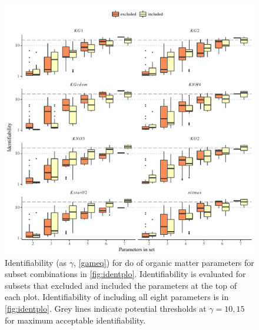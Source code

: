 \documentclass[letterpaper,12pt,oneside]{article}\usepackage[]{graphicx}\usepackage[]{color}
\begin{document}
\begin{figure}[!ht]

{\centering \includegraphics[width=\textwidth]{figs/exclex-1} 

}

\caption{Identifiability (as $\gamma$, \cref{gameq}) for \ac{do} of organic matter parameters for subset combinations in \cref{fig:identplo}.  Identifiability is evaluated for subsets that excluded and included the parameters at the top of each plot. Identifiability of including all eight parameters is in \cref{fig:identplo}. Grey lines indicate potential thresholds at $\gamma = 10, 15$ for maximum acceptable identifiability.}\label{fig:exclex}
\end{figure}
\end{document}
